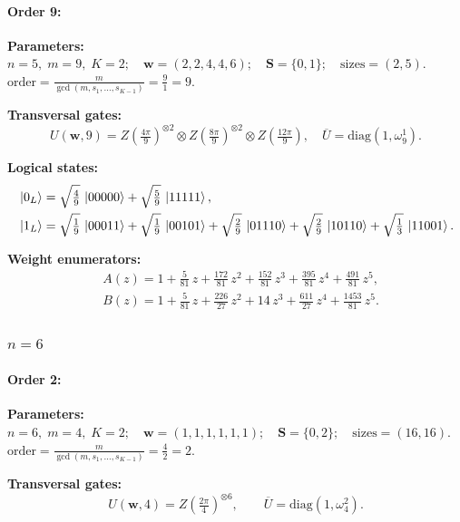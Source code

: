 \documentclass[pdflatex,sn-nature]{sn-jnl}%
\theoremstyle{thmstyleone}%
\theoremstyle{thmstyletwo}%
\theoremstyle{thmstylethree}%
\begin{document}
\begin{appendices}
\paragraph{\textbf{Order 9:}}
\noindent\textbf{Parameters:} $n=5,\; m=9,\; K=2;\quad \mathbf w=(2, 2, 4, 4, 6);\quad \mathbf S=\{0, 1\};\quad \text{sizes}=\left(2, 5\right).$ $\displaystyle \text{order}=\frac{m}{\gcd(m,s_1,\dots,s_{K-1})}=\frac{9}{1}=9.$

\noindent\textbf{Transversal gates:}
\[
    U(\mathbf w,9)=Z \left(\tfrac{4\pi}{9}\right)^{\otimes2} \otimes Z \left(\tfrac{8\pi}{9}\right)^{\otimes2} \otimes Z \left(\tfrac{12\pi}{9}\right),\quad
    \overline U=\mathrm{diag}(1,\omega_{9}^{1}).
\]

\noindent\textbf{Logical states:}
\begin{align*}
    &\ket{0_L} = \sqrt{\tfrac{4}{9}}\,\ket{00000} + \sqrt{\tfrac{5}{9}}\,\ket{11111}, \\
    &\ket{1_L} = \sqrt{\tfrac{1}{9}}\,\ket{00011} + \sqrt{\tfrac{1}{9}}\,\ket{00101} + \sqrt{\tfrac{2}{9}}\,\ket{01110} + \sqrt{\tfrac{2}{9}}\,\ket{10110} + \sqrt{\tfrac{1}{3}}\,\ket{11001}.
\end{align*}

\noindent\textbf{Weight enumerators:}
\begin{align*}
    &A(z) = 1 + \tfrac{5}{81}\,z + \tfrac{172}{81}\,z^{2} + \tfrac{152}{81}\,z^{3} + \tfrac{395}{81}\,z^{4} + \tfrac{491}{81}\,z^{5}, \\
    &B(z) = 1 + \tfrac{5}{81}\,z + \tfrac{226}{27}\,z^{2} + 14\,z^{3} + \tfrac{611}{27}\,z^{4} + \tfrac{1453}{81}\,z^{5}.
\end{align*}

\subsubsection{$n=6$}
\label{subsubsec:K2n6}
\paragraph{\textbf{Order 2:}}
\noindent\textbf{Parameters:} $n=6,\; m=4,\; K=2;\quad \mathbf w=(1, 1, 1, 1, 1, 1);\quad \mathbf S=\{0, 2\};\quad \text{sizes}=\left(16, 16\right).$ $\displaystyle \text{order}=\frac{m}{\gcd(m,s_1,\dots,s_{K-1})}=\frac{4}{2}=2.$

\noindent\textbf{Transversal gates:}
\[
    U(\mathbf w,4)=Z \left(\tfrac{2\pi}{4}\right)^{\otimes6},\qquad
    \overline U=\mathrm{diag}(1,\omega_{4}^{2}).
\]


\end{appendices}
\end{document}
